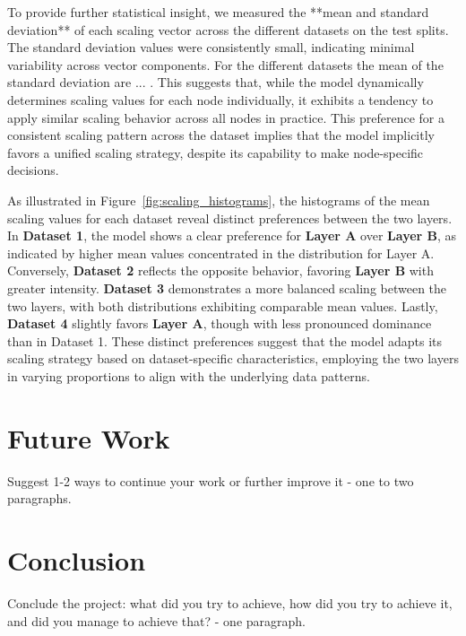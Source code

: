 \documentclass{acmart}
\begin{document}
To provide further statistical insight, we measured the **mean and standard deviation** of each scaling vector across the different datasets on the test splits. The standard deviation values were consistently small, indicating minimal variability across vector components. For the different datasets the mean of the standard deviation are ... . This suggests that, while the model dynamically determines scaling values for each node individually, it exhibits a tendency to apply similar scaling behavior across all nodes in practice. This preference for a consistent scaling pattern across the dataset implies that the model implicitly favors a unified scaling strategy, despite its capability to make node-specific decisions.



As illustrated in Figure~\ref{fig:scaling_histograms}, the histograms of the mean scaling values for each dataset reveal distinct preferences between the two layers. In \textbf{Dataset 1}, the model shows a clear preference for \textbf{Layer A} over \textbf{Layer B}, as indicated by higher mean values concentrated in the distribution for Layer A. Conversely, \textbf{Dataset 2} reflects the opposite behavior, favoring \textbf{Layer B} with greater intensity. \textbf{Dataset 3} demonstrates a more balanced scaling between the two layers, with both distributions exhibiting comparable mean values. Lastly, \textbf{Dataset 4} slightly favors \textbf{Layer A}, though with less pronounced dominance than in Dataset 1. These distinct preferences suggest that the model adapts its scaling strategy based on dataset-specific characteristics, employing the two layers in varying proportions to align with the underlying data patterns.





\section{Future Work}
Suggest 1-2 ways to continue your work or further improve it - one to two paragraphs.

\section{Conclusion}
Conclude the project: what did you try to achieve, how did you try to achieve it, and did you manage to achieve that? - one paragraph.



\end{document}
